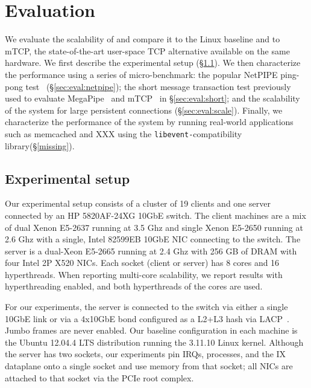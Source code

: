 
\section{Evaluation}
\label{sec:eval}

We evaluate the scalability of \ix and compare it to the Linux baseline
and to mTCP, the state-of-the-art user-space TCP alternative available
on the same hardware.  We first describe the experimental setup
(\S\ref{sec:eval:setup}).  We then characterize the performance using
a series of micro-benchmark: the popular NetPIPE ping-pong
test~\cite{snell1996netpipe} (\S\ref{sec:eval:netpipe}); the short
message transaction test previously used to evaluate
MegaPipe~\cite{han2012megapipe} and mTCP~\cite{jeong2014mtcp} in
\S\ref{sec:eval:short}; and the scalability of the system for large
persistent connections (\S\ref{sec:eval:scale}).  Finally, we
characterize the performance of the \ix system by running real-world
applications such as memcached and XXX using the
\texttt{libevent-}compatibility library(\S\ref{missing}).


\subsection{Experimental setup}
\label{sec:eval:setup}

Our experimental setup consists of a cluster of 19 clients and one
server connected by an HP 5820AF-24XG 10GbE switch.  The client
machines are a mix of dual Xenon E5-2637 running at 3.5 Ghz and single Xenon E5-2650 running at 2.6 Ghz with a single, Intel
82599EB 10GbE NIC connecting to the switch.  The server is a dual-Xeon E5-2665
running at 2.4 Ghz with 256 GB of DRAM with four Intel 2P X520 NICs.  Each
socket (client or server) has 8 cores and 16 hyperthreads.  When
reporting multi-core scalability, we report results with
hyperthreading enabled, and both hyperthreads of the cores are used.

For our experiments, the server is connected to
the switch via either a single 10GbE link or via a 4x10GbE bond configured as a L2+L3
hash via LACP~\cite{ieee802.3ad}. Jumbo
frames are never enabled.  Our baseline configuration in each machine
is the Ubuntu 12.04.4 LTS distribution running the 3.11.10 Linux kernel.  Although
the server has two sockets, our experiments pin IRQs, processes, and
the IX dataplane onto a single socket and use memory from that socket;
all NICs are attached to that socket via the PCIe root complex. 

